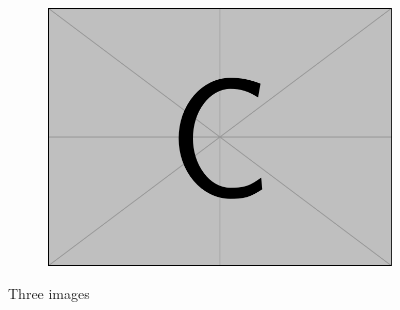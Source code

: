 \documentclass[12pt]{ctexart}
\begin{document}
\begin{figure}[!htbp]
	\begin{subfigure}[t]{0.3\textwidth}
		\centering
		\includegraphics[width=\textwidth]{img/example-image-c.pdf}
		\caption*{}
		\label{}
	\end{subfigure}
	\caption{Three images}
	\label{Three images}
\end{figure}
\end{document}
